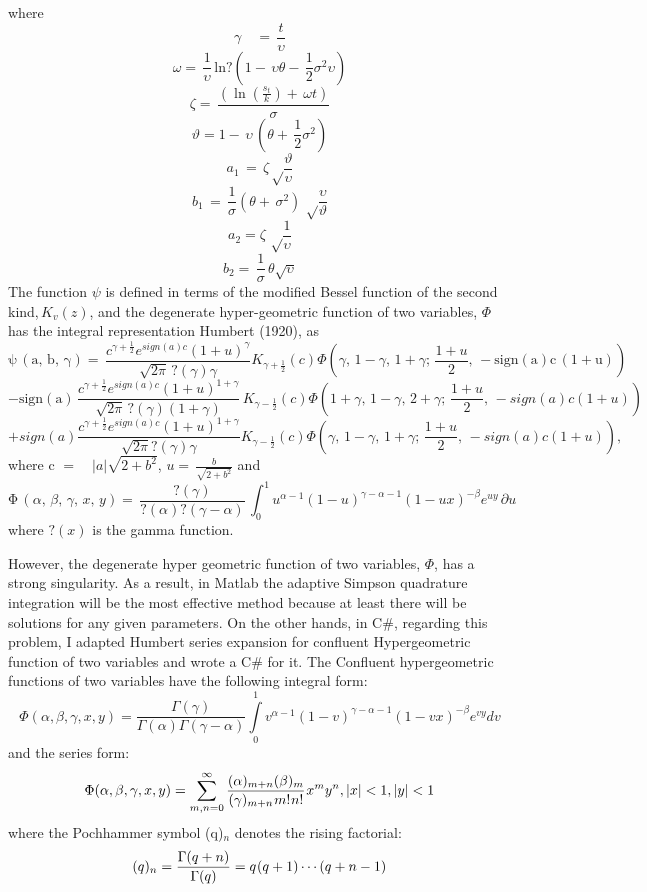 where
\[
\gamma \quad =
\, \frac{t}{\upsilon }
\]
\[
\omega =\, \frac{1}{\upsilon }\, \mathrm{ln?}(1-\, \upsilon \theta -\, 
\frac{1}{2}\sigma^{2}\upsilon )
\]
\[
\zeta =\, \frac{(\ln \left( \frac{s_{t}}{k} \right)+\, \omega t)}{\sigma }
\]
\[
\vartheta =1-\, \upsilon \, (\theta +\, \frac{1}{2}\sigma^{2})
\]
\[
a_{1}\, =\, \zeta \sqrt \frac{\vartheta }{\upsilon } 
\]
\[
b_{1}\, =\, \frac{1}{\sigma }(\theta +\, \sigma^{2})\, \sqrt \frac{\upsilon 
}{\vartheta } 
\]
\[
a_{2}=\zeta \, \sqrt \frac{1}{\upsilon } 
\]
\[
b_{2}=\, \frac{1}{\sigma }\, \theta \sqrt \upsilon 
\]
The function $\psi $ is defined in terms of the modified Bessel function of 
the second kind,${\, K}_{v}(z)$, and the degenerate hyper-geometric function 
of two variables, $\Phi $ has the integral representation Humbert (1920), as
\[
\mathrm{\psi \, }\left( \mathrm{a,\, b,\, \gamma } \right)\mathrm{=\, 
}\frac{c^{\gamma +\frac{1}{2}}e^{sign\left( a \right)c}\left( 1+u 
\right)^{\gamma }}{\sqrt {2\pi } \, ?\left( \gamma \right)\gamma }K_{\gamma 
+\frac{1}{2}}(c)\Phi \left( \gamma ,\, 1-\gamma ,\, 1+\gamma ;\, 
\frac{1+u}{2}\mathrm{,\, -sign}\left( \mathrm{a} \right)\mathrm{c}\, \left( 
\mathrm{1+u} \right) \right)\]\[\mathrm{-sign(a)\, }\frac{c^{\gamma 
+\frac{1}{2}}e^{sign\left( a \right)c}\left( 1+u \right)^{1+\gamma }}{\sqrt 
{2\pi } \, ?\left( \gamma \right)\left( 1+\gamma \right)}\mathrm{\, 
}K_{\gamma -\frac{1}{2}}\left( c \right)\Phi \left( 1+\gamma ,\, 1-\gamma 
,\, 2+\gamma ;\, \frac{1+u}{2},\, -sign\left( a \right)c\left( 1+u \right) 
\right)\]\[+sign(a)\frac{c^{\gamma +\frac{1}{2}}e^{sign\left( a \right)c}\left( 
1+u \right)^{1+\gamma }}{\sqrt {2\pi } ?\left( \gamma \right)\gamma 
}K_{\gamma -\frac{1}{2}}(c)\Phi \left( \gamma ,\, 1-\gamma ,\, 1+\gamma ;\, 
\frac{1+u}{2},\, -sign\left( a \right)c(1+u) \right),
\]
where c $= \quad \left| a \right|\sqrt {2+b^{2}} $, $u=\, \frac{b}{\sqrt 
{2+b^{2}} }$ and
\[
\mathrm{\Phi }\, \left( \alpha ,\, \beta ,\, \gamma ,\, x,\, y \right)=\, 
\frac{?(\gamma )}{?(\alpha )?(\gamma -\alpha )}\, \int_0^1 {u^{\alpha 
-1}{(1-u)}^{\gamma -\alpha -1}{(1-ux)}^{-\beta }e^{uy}\, \partial u} 
\]
where $?(x)$ is the gamma function.


However, the degenerate hyper geometric function of two variables, $\Phi $, 
has a strong singularity. As a result, in Matlab the adaptive Simpson 
quadrature integration will be the most effective method because at least 
there will be solutions for any given parameters. On the other hands, in 
C{\#}, regarding this problem, I adapted Humbert series expansion for 
confluent Hypergeometric function of two variables and wrote a C{\#} for it. 
The Confluent hypergeometric functions of two variables have the following 
integral form:
\[
\Phi (\alpha ,\beta ,\gamma ,x,y)=\frac{\Gamma (\gamma )}{\Gamma (\alpha 
)\Gamma (\gamma -\alpha )}\int\limits_0^1 {v^{\alpha -1}(1-v)^{\gamma 
-\alpha -1}(1-vx)^{-\beta }e^{vy}dv} 
\]
and the series form:
\[
\Phi (\alpha ,\beta ,\gamma ,x,y)=\sum\limits_{m,n=0}^\infty {\frac{(\alpha 
)_{m+n} (\beta )_{m} }{(\gamma )_{m+n} {\mkern 1mu}m!{\mkern 1mu}n!}} 
{\mkern 1mu}x^{m}y^{n} ,\vert x\vert <1,\vert y\vert <1
\]
where the Pochhammer symbol (q)$_{n}$ denotes the rising factorial:
\[
(q)_{n} =\frac{\Gamma (q+n)}{\Gamma (q)}=q{\mkern 1mu}(q+1)\cdots (q+n-1) 
\]

